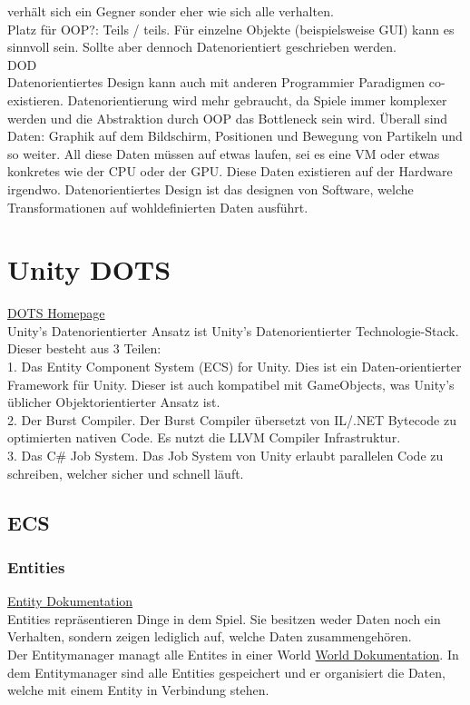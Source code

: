 \documentclass[12pt, titlepage]{article}
\begin{document}
verhält sich ein Gegner sonder eher wie sich alle verhalten.\\Platz für OOP?: Teils / teils. Für einzelne Objekte (beispielsweise GUI) kann es sinnvoll sein. Sollte aber dennoch Datenorientiert geschrieben werden.
\\ DOD \cite{DOD}\\
Datenorientiertes Design kann auch mit anderen Programmier Paradigmen co-existieren. Datenorientierung wird mehr gebraucht, da Spiele immer komplexer werden und die Abstraktion durch OOP das Bottleneck sein wird. Überall sind Daten: Graphik auf dem Bildschirm, Positionen und Bewegung von Partikeln und so weiter. All diese Daten müssen auf etwas laufen, sei es eine VM oder etwas konkretes wie der CPU oder der GPU. Diese Daten existieren auf der Hardware irgendwo. Datenorientiertes Design ist das designen von Software, welche Transformationen auf wohldefinierten Daten ausführt. 
\newpage
\section{Unity DOTS}
\href{https://unity.com/de/dots}{DOTS Homepage} \\
Unity's Datenorientierter Ansatz ist Unity's Datenorientierter Technologie-Stack. Dieser besteht aus 3 Teilen:\\
1. Das Entity Component System (ECS) for Unity. Dies ist ein Daten-orientierter Framework für Unity. Dieser ist auch kompatibel mit GameObjects, was Unity's üblicher Objektorientierter Ansatz ist.\\2. Der Burst Compiler. Der Burst Compiler übersetzt von IL/.NET Bytecode zu optimierten nativen Code. Es nutzt die LLVM Compiler Infrastruktur.\\3. Das C\# Job System. Das Job System von Unity erlaubt parallelen Code zu schreiben, welcher sicher und schnell läuft.
\subsection{ECS}
\subsubsection{Entities}
\href{https://docs.unity3d.com/Packages/com.unity.entities@0.1/manual/ecs_entities.html}{Entity Dokumentation}\\Entities repräsentieren Dinge in dem Spiel. Sie besitzen weder Daten noch ein Verhalten, sondern zeigen lediglich auf, welche Daten zusammengehören. \\Der Entitymanager managt alle Entites in einer World \href{https://docs.unity3d.com/Packages/com.unity.entities@0.1/manual/world.html}{World Dokumentation}. In dem Entitymanager sind alle Entities gespeichert und er organisiert die Daten, welche mit einem Entity in Verbindung stehen. 
\end{document}
